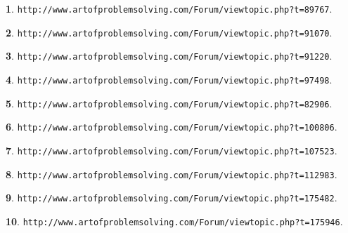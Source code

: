 \documentclass{article}
\theoremstyle{definition}
\newtheorem{s}{}
\begin{document}
\begin{s}
\texttt{http://www.artofproblemsolving.com/Forum/viewtopic.php?t=89767}.
\end{s}




\begin{s}
\texttt{http://www.artofproblemsolving.com/Forum/viewtopic.php?t=91070}.
\end{s}





\begin{s}
\texttt{http://www.artofproblemsolving.com/Forum/viewtopic.php?t=91220}.
\end{s}




\begin{s}
\texttt{http://www.artofproblemsolving.com/Forum/viewtopic.php?t=97498}.
\end{s}




\begin{s}
\texttt{http://www.artofproblemsolving.com/Forum/viewtopic.php?t=82906}.
\end{s}





\begin{s}
\texttt{http://www.artofproblemsolving.com/Forum/viewtopic.php?t=100806}.
\end{s}




\begin{s}
\texttt{http://www.artofproblemsolving.com/Forum/viewtopic.php?t=107523}.
\end{s}




\begin{s}
\texttt{http://www.artofproblemsolving.com/Forum/viewtopic.php?t=112983}.
\end{s}





\begin{s}
\texttt{http://www.artofproblemsolving.com/Forum/viewtopic.php?t=175482}.
\end{s}




\begin{s}
\texttt{http://www.artofproblemsolving.com/Forum/viewtopic.php?t=175946}.
\end{s}
\end{document}

